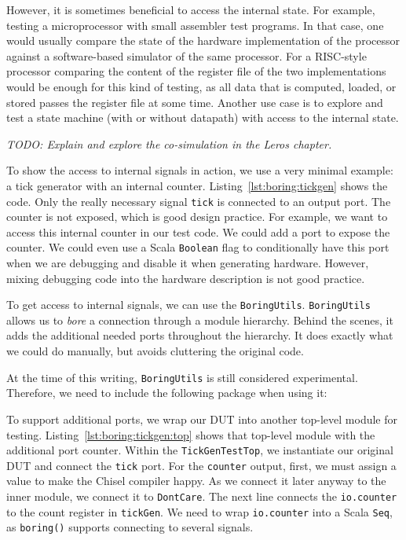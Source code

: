 \documentclass[%
    10pt,
    headinclude, footexclude,
    openright, %
    notitlepage,
    cleardoubleempty,
    headsepline,
    pointlessnumbers,
    bibtotoc, idxtotoc,
    ]{scrbook}
\newcommand{\code}[1]{{\lstinline[basicstyle=\small\ttfamily]{#1}}}
\newcommand{\todo}[1]{{\emph{TODO: #1}}}
\begin{document}
However, it is sometimes beneficial to access the internal state. For example,
testing a microprocessor with small assembler test programs.
In that case, one would usually compare the state of the hardware implementation of
the processor against a software-based simulator of the same processor.
For a RISC-style processor comparing the content of the register file of the two implementations
would be enough for this kind of testing, as all data that is computed, loaded,
or stored passes the register file at some time.
Another use case is to explore and test a state machine (with or without datapath)
with access to the internal state.


\todo{Explain and explore the co-simulation in the Leros chapter.}



To show the access to internal signals in action, we use a very minimal example:
a tick generator with an internal counter. Listing~\ref{lst:boring:tickgen} shows the code.
Only the really necessary signal \code{tick} is connected to an output port.
The counter is not exposed, which is good design practice.
For example, we want to access this internal counter in our test code.
We could add a port to expose the counter. We could even use a Scala \code{Boolean}
flag to conditionally have this port when we are debugging and disable it
when generating hardware.
However, mixing debugging code into the hardware description is not good practice.


To get access to internal signals, we can use the \code{BoringUtils}. 
\code{BoringUtils} allows us to \emph{bore} a connection through a module hierarchy.
Behind the scenes, it adds the additional needed ports throughout the hierarchy.
It does exactly what we could do manually, but avoids cluttering the original code.

At the time of this writing, \code{BoringUtils} is still considered experimental.
Therefore, we need to include the following package when using it:



To support additional ports, we wrap our DUT into another top-level module for testing.
Listing~\ref{lst:boring:tickgen:top} shows that top-level module with the additional port
counter. Within the \code{TickGenTestTop}, we instantiate our original DUT and connect
the \code{tick} port. For the \code{counter} output, first, we must assign a value to
make the Chisel compiler happy. As we connect it later anyway to the inner module,
we connect it to \code{DontCare}.
The next line connects the \code{io.counter} to the count register in \code{tickGen}.
We need to wrap \code{io.counter} into a Scala \code{Seq}, as \code{boring()} supports
connecting to several signals.
\end{document}
